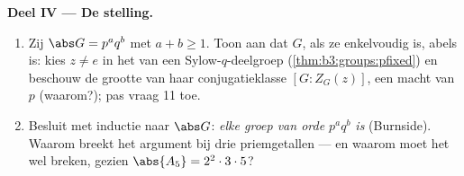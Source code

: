\begin{problem}
\medskip
\noindent\textbf{Deel IV --- De stelling.}
\begin{enumerate}[resume]
  \item Zij $\abs G = p^aq^b$ met $a + b \geq 1$. Toon aan dat $G$,
        als ze enkelvoudig is, abels is: kies $z \neq e$ in het
         van een Sylow-$q$-deelgroep
        (\cref{thm:b3:groups:pfixed}) en beschouw de grootte van
        haar conjugatieklasse $[G : Z_G(z)]$, een macht van $p$
        (waarom?); pas vraag 11 toe.
  \item Besluit met inductie naar $\abs G$: \emph{elke groep van
        orde $p^aq^b$ is } (Burnside). Waarom breekt het
        argument bij drie priemgetallen --- en waarom moet het wel
        breken, gezien $\abs{A_5} = 2^2\cdot3\cdot5$?
\end{enumerate}


\end{problem}
